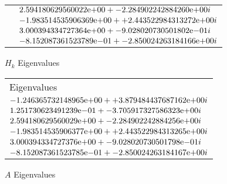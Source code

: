 \begin{figure}[tbh]
\begin{tabular}{ |p{1cm}|| p{10cm}|}
  &	${ 2.594180629560022}\mathrm{e}{+00} + {- 2.284902242884260}\mathrm{e}{+00i}$\\
  &	${-1.983514535906369}\mathrm{e}{+00} + {+ 2.443522984313272}\mathrm{e}{+00i}$\\
  &	${ 3.000394334727364}\mathrm{e}{+00} + {- 9.028020730501802}\mathrm{e}{-01i}$ \\  
  &	${-8.152087361523789}\mathrm{e}{-01} + {- 2.850024263184166}\mathrm{e}{+00i}$ \\  
\hline  
\end{tabular} 
\caption{$H_{k}$ Eigenvalues}
   \label{tab:h_k_eig}
\end{figure} 


\begin{figure}[tbh]
 \centering    
\begin{tabular}{ ||p{10cm}|}
\hline
 Eigenvalues \\ \hhline{|=|}   
\hline
${-1.246365732148965}\mathrm{e}{+00} + {+ 3.879484437687162}\mathrm{e}{+00i}$\\
${ 1.251730623491239}\mathrm{e}{-01} + {- 3.705917327586323}\mathrm{e}{+00i}$\\
${ 2.594180629560029}\mathrm{e}{+00} + {- 2.284902242884256}\mathrm{e}{+00i}$\\
${-1.983514535906377}\mathrm{e}{+00} + {+ 2.443522984313265}\mathrm{e}{+00i}$\\
${ 3.000394334727376}\mathrm{e}{+00} + {- 9.028020730501798}\mathrm{e}{-01i}$\\  
${-8.152087361523785}\mathrm{e}{-01} + {- 2.850024263184167}\mathrm{e}{+00i}$\\  
\hline  
\end{tabular} 
\caption{$A$ Eigenvalues}
   \label{tab:a_eig}
\end{figure} 
